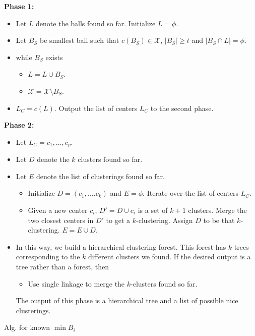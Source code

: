 \documentclass[11pt]{article}
\newenvironment{alg}{
    \begin{list}{}{
        \setlength{\itemsep}{2pt}
        \setlength{\parsep}{0pt}
        \setlength{\parskip}{0pt}
        \setlength{\topsep}{1pt}
    }
}
{
    \end{list}
}
\begin{document}
\begin{algorithm}
\begin{alg}
\item[] \textbf{Phase 1:}
\begin{itemize}
\item[] Let $L$ denote the balls found so far. Initialize $L = \phi$.
\item[] Let $B_S$ be smallest ball such that $c(B_S) \in \mathcal{X}$, $|B_S| \ge t$  and $|B_S \cap L | = \phi$.
\item[] while $B_S$ exists
\begin{itemize}
\item[] $L = L \cup B_S$. 
\item[] $\mathcal{X} = \mathcal{X}\setminus B_S$.
\end{itemize}
\item[] $L_C = c(L)$. Output the list of centers $L_C$ to the second phase.
\end{itemize}

\item[] \textbf{Phase 2:}
\begin{itemize}
\item[] Let $L_C = c_1,\ldots,c_p$.
\item[] Let $D$ denote the $k$ clusters found so far. 
\item[] Let $E$ denote the list of clusterings found so far.
\begin{itemize}
\item[] Initialize $D = (c_1,\ldots.c_k)$ and $E = \phi$. Iterate over the list of centers $L_C$.
\item[] Given a new center $c_i$, $D' = D \cup c_i$ is a set of $k+1$ clusters. Merge the two closest centers in $D'$ to get a $k$-clustering. Assign $D$ to be that $k$-clustering. $E = E \cup D$.
\end{itemize}

\item[] In this way, we build a hierarchical clustering forest. This forest has $k$ trees corresponding to the $k$ different clusters we found. If the desired output is a tree rather than a forest, then 
\begin{itemize}
\item[] Use single linkage to merge the $k$-clusters found so far. 
\end{itemize}
The output of this phase is a hierarchical tree and a list of possible nice clusterings. 
\end{itemize}
\label{alg:Known}
\end{alg}
\caption{Alg. for known $\min{B_i}$}
\end{algorithm}
\end{document}
